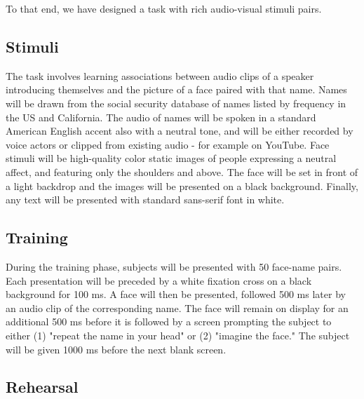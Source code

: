 To that end, we have designed a task with rich audio-visual stimuli pairs.
%
% 
\subsection*{Stimuli}
The task involves learning associations between audio clips of a speaker introducing themselves and the picture of a face paired with that name. Names will be drawn from the social security database of names listed by frequency in the US and California. The audio of names will be spoken in a standard American English accent also with a neutral tone, and will be either recorded by voice actors or clipped from existing audio - for example on YouTube. Face stimuli will be high-quality color static images of people expressing a neutral affect, and featuring only the shoulders and above. The face will be set in front of a light backdrop and the images will be presented on a black background. Finally, any text will be presented with standard sans-serif font in white.  
\subsection*{Training}
During the training phase, subjects will be presented with 50 face-name pairs. Each presentation will be preceded by a white fixation cross on a black background for 100 ms. A face will then be presented, followed 500 ms later by an audio clip of the corresponding name. The face will remain on display for an additional 500 ms before it is followed by a screen prompting the subject to either (1) "repeat the name in your head" or (2) "imagine the face." The subject will be given 1000 ms before the next blank screen. 

\subsection*{Rehearsal}

